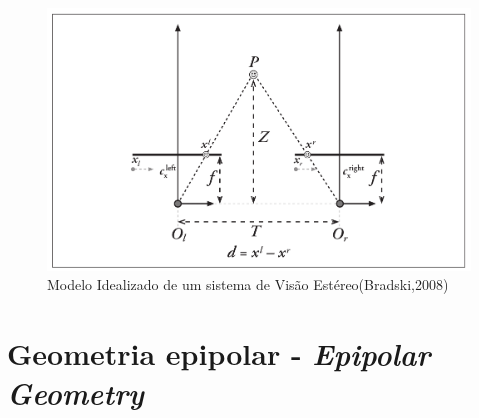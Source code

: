 \begin{figure}[H]
 	\centering
 	\includegraphics[scale=0.35]{./Resources/stereo_image_geometric_model.png}
 	\caption{Modelo Idealizado de um sistema de Visão Estéreo(Bradski,2008)}
 	\label{stereo_image_geometric_model}
\end{figure}


\section{Geometria epipolar - \textit{Epipolar Geometry}}







